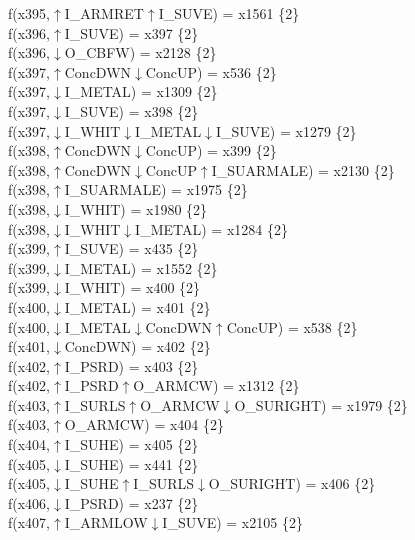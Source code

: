 f(x395,$\uparrow$I\_ARMRET$\uparrow$I\_SUVE) = x1561 \{2\} \\  
f(x396,$\uparrow$I\_SUVE) = x397 \{2\} \\  
f(x396,$\downarrow$O\_CBFW) = x2128 \{2\} \\  
f(x397,$\uparrow$ConcDWN$\downarrow$ConcUP) = x536 \{2\} \\  
f(x397,$\downarrow$I\_METAL) = x1309 \{2\} \\  
f(x397,$\downarrow$I\_SUVE) = x398 \{2\} \\  
f(x397,$\downarrow$I\_WHIT$\downarrow$I\_METAL$\downarrow$I\_SUVE) = x1279 \{2\} \\  
f(x398,$\uparrow$ConcDWN$\downarrow$ConcUP) = x399 \{2\} \\  
f(x398,$\uparrow$ConcDWN$\downarrow$ConcUP$\uparrow$I\_SUARMALE) = x2130 \{2\} \\  
f(x398,$\uparrow$I\_SUARMALE) = x1975 \{2\} \\  
f(x398,$\downarrow$I\_WHIT) = x1980 \{2\} \\  
f(x398,$\downarrow$I\_WHIT$\downarrow$I\_METAL) = x1284 \{2\} \\  
f(x399,$\uparrow$I\_SUVE) = x435 \{2\} \\  
f(x399,$\downarrow$I\_METAL) = x1552 \{2\} \\  
f(x399,$\downarrow$I\_WHIT) = x400 \{2\} \\  
f(x400,$\downarrow$I\_METAL) = x401 \{2\} \\  
f(x400,$\downarrow$I\_METAL$\downarrow$ConcDWN$\uparrow$ConcUP) = x538 \{2\} \\  
f(x401,$\downarrow$ConcDWN) = x402 \{2\} \\  
f(x402,$\uparrow$I\_PSRD) = x403 \{2\} \\  
f(x402,$\uparrow$I\_PSRD$\uparrow$O\_ARMCW) = x1312 \{2\} \\  
f(x403,$\uparrow$I\_SURLS$\uparrow$O\_ARMCW$\downarrow$O\_SURIGHT) = x1979 \{2\} \\  
f(x403,$\uparrow$O\_ARMCW) = x404 \{2\} \\  
f(x404,$\uparrow$I\_SUHE) = x405 \{2\} \\  
f(x405,$\downarrow$I\_SUHE) = x441 \{2\} \\  
f(x405,$\downarrow$I\_SUHE$\uparrow$I\_SURLS$\downarrow$O\_SURIGHT) = x406 \{2\} \\  
f(x406,$\downarrow$I\_PSRD) = x237 \{2\} \\  
f(x407,$\uparrow$I\_ARMLOW$\downarrow$I\_SUVE) = x2105 \{2\} \\  
